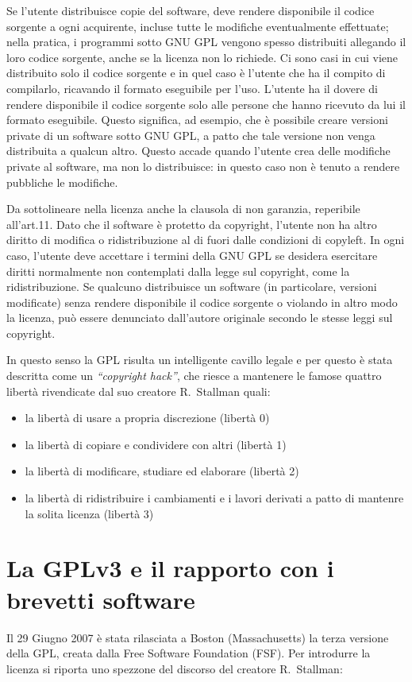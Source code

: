 Se l'utente distribuisce copie del software, deve rendere disponibile il codice sorgente a ogni acquirente, incluse tutte le modifiche eventualmente effettuate; nella pratica, i programmi sotto GNU GPL vengono spesso distribuiti allegando il loro codice sorgente, anche se la licenza non lo richiede. Ci sono casi in cui viene distribuito solo il codice sorgente e in quel caso è l'utente che ha il compito di compilarlo, ricavando il formato eseguibile per l'uso.
L'utente ha il dovere di rendere disponibile il codice sorgente solo alle persone che hanno ricevuto da lui il formato eseguibile. Questo significa, ad esempio, che è possibile creare versioni private di un software sotto GNU GPL, a patto che tale versione non venga distribuita a qualcun altro. Questo accade quando l'utente crea delle modifiche private al software, ma non lo distribuisce: in questo caso non è tenuto a rendere pubbliche le modifiche.

Da sottolineare nella licenza anche la clausola di non garanzia, reperibile all'art.11. Dato che il software è protetto da copyright, l'utente non ha altro diritto di modifica o ridistribuzione al di fuori dalle condizioni di copyleft. In ogni caso, l'utente deve accettare i termini della GNU GPL se desidera esercitare diritti normalmente non contemplati dalla legge sul copyright, come la ridistribuzione. Se qualcuno distribuisce un software (in particolare, versioni modificate) senza rendere disponibile il codice sorgente o violando in altro modo la licenza, può essere denunciato dall'autore originale secondo le stesse leggi sul copyright.

In questo senso la GPL risulta un intelligente cavillo legale e per questo è stata descritta come un \textit{``copyright hack''}, che riesce a mantenere le famose quattro libertà rivendicate dal suo creatore R.~Stallman quali:
\begin{itemize}
\item la libertà di usare a propria discrezione (libertà 0)
\item la libertà di copiare e condividere con altri (libertà 1)
\item la libertà di modificare, studiare ed elaborare (libertà 2)
\item la libertà di ridistribuire i cambiamenti e i lavori derivati a patto di mantenre la solita licenza (libertà 3)
\end{itemize}


\section{La GPLv3 e il rapporto con i brevetti software}
Il 29 Giugno 2007 è stata rilasciata a Boston (Massachusetts) la terza versione della GPL, creata dalla  Free Software Foundation (FSF).
Per introdurre la licenza si riporta uno spezzone del discorso del creatore R.~Stallman:

